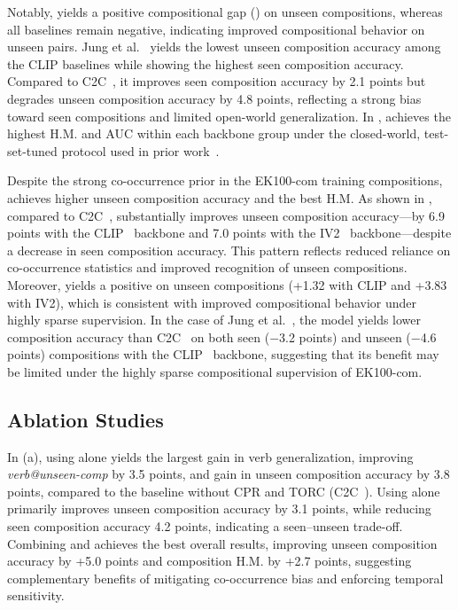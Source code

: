 \noindent Notably, \ours{} yields a positive compositional gap (\cg{}) on unseen compositions, whereas all baselines remain negative, indicating improved compositional behavior on unseen pairs.
Jung et al.~\cite{jung2025crr} yields the lowest unseen composition accuracy among the CLIP baselines while showing the highest seen composition accuracy. Compared to C2C~\cite{li2024c2c}, it improves seen composition accuracy by 2.1 points but degrades unseen composition accuracy by 4.8 points, reflecting a strong bias toward seen compositions and limited open-world generalization.
In , \ours{} achieves the highest H.M. and AUC within each backbone group under the closed-world, test-set-tuned protocol used in prior work~\cite{li2024c2c, jung2025crr, ye2025logic}.




Despite the strong co-occurrence prior in the EK100-com training compositions, \ours{} achieves higher unseen composition accuracy and the best H.M.
As shown in , compared to C2C~\cite{li2024c2c}, \ours{} substantially improves unseen composition accuracy---by 6.9 points with the CLIP~\cite{radford2021clip} backbone and 7.0 points with the IV2~\cite{wang2024iv2} backbone---despite a decrease in seen composition accuracy.
This pattern reflects reduced reliance on co-occurrence statistics and improved recognition of unseen compositions.
Moreover, \ours{} yields a positive \cg{} on unseen compositions (+1.32 with CLIP and +3.83 with IV2), which is consistent with improved compositional behavior under highly sparse supervision.
In the case of Jung et al.~\cite{jung2025crr}, the model yields lower composition accuracy than C2C~\cite{li2024c2c} on both seen ($-$3.2 points) and unseen ($-$4.6 points) compositions with the CLIP~\cite{radford2021clip} backbone, suggesting that its benefit may be limited under the highly sparse compositional supervision of EK100-com.










\subsection{Ablation Studies}
\label{sec:ablation}

In  (a),
using \torc{} alone yields the largest gain in verb generalization, improving \textit{verb@unseen-comp} by 3.5 points, and gain in unseen composition accuracy by 3.8 points, compared to the baseline without CPR and TORC (C2C~\cite{li2024c2c}).
Using \cpr{} alone primarily improves unseen composition accuracy by 3.1 points, while reducing seen composition accuracy 4.2 points, indicating a seen--unseen trade-off.
Combining \cpr{} and \torc{} achieves the best overall results, improving unseen composition accuracy by +5.0 points and composition H.M. by +2.7 points, suggesting complementary benefits of mitigating co-occurrence bias and enforcing temporal sensitivity.



